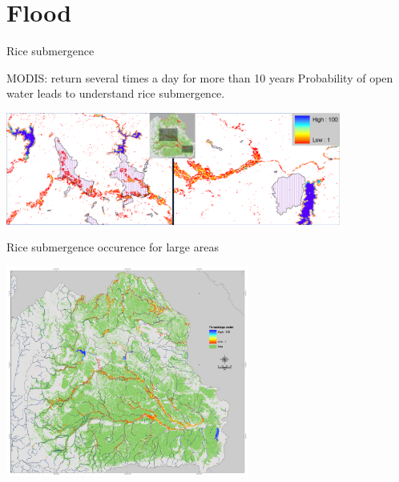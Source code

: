 \documentclass[xcolor=dvipsnames,beamer]{beamer} %
\begin{document}
\section{Flood}
\begin{frame}[fragile]{Rice submergence}

MODIS: return several times a day for more than 10 years\newline
Probability of open water leads to understand rice submergence.

\begin{center}
\includegraphics[width=11cm]{NETH_ASO_FREQ_irrig_area_insert_big_legend}
\end{center}

\end{frame}

\begin{frame}[fragile]{Rice submergence occurence for large areas}

\begin{center}
\includegraphics[width=8cm]{NETHA_Freq_Sep}
\end{center}

\end{frame}
\end{document}
